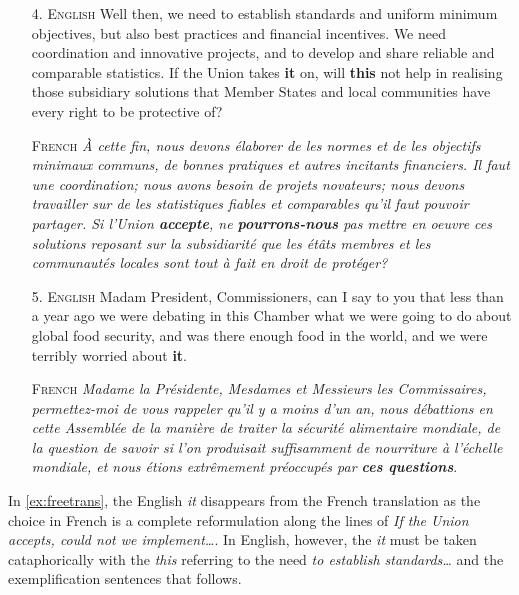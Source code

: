 \documentclass[10pt, a4paper]{article}
\begin{document}
\begin{enumerate}

\item[4.]\label{ex:freetrans} 
\textsc{English} Well then, we need to establish standards and uniform minimum 
objectives, but also best practices and financial incentives. We need 
coordination and innovative projects, and to develop and share reliable and 
comparable statistics. If the Union takes \textbf{it} on, will \textbf{this} not help in 
realising those subsidiary solutions that Member States and local communities 
have every right to be protective of? 

\textsc{French} \textit{À cette fin, nous devons élaborer de les normes et de 
les 
objectifs minimaux communs, de bonnes pratiques et autres incitants financiers. 
Il faut une coordination; nous avons besoin de projets novateurs; nous devons 
travailler sur de les statistiques fiables et comparables qu'il faut pouvoir 
partager. Si l'Union \textbf{accepte}, ne \textbf{pourrons-nous} pas mettre en oeuvre ces 
solutions reposant sur la subsidiarité que les étâts membres et les communautés 
locales sont tout à fait en droit de protéger?}


\item[5.]\label{ex:shellnoun}\textsc{English} Madam President, Commissioners, 
can I 
say to you that less than 
a year ago we were debating in this Chamber what we were going to do about 
global food security, and was there enough food in the world, and we were 
terribly worried about \textbf{it}.

\textsc{French} \textit{Madame la Présidente, Mesdames et Messieurs les 
Commissaires, permettez-moi de vous rappeler qu'il y a moins d'un an, nous 
débattions en cette Assemblée de la manière de traiter la sécurité alimentaire 
mondiale, de la question de savoir si l'on produisait suffisamment de 
nourriture à l'échelle mondiale, et nous étions extrêmement préoccupés par 
\textbf{ces questions}}.

\end{enumerate}

In \ref{ex:freetrans}, the English \textit{it} disappears from the 
French translation as the choice in French is a complete reformulation along the 
lines of \textit{If the Union accepts, could not we implement\ldots}. In 
English, however, the \textit{it} must be taken cataphorically with the 
\textit{this} referring to the need \textit{to establish standards\ldots} and 
the exemplification sentences that follows. 
\end{document}
